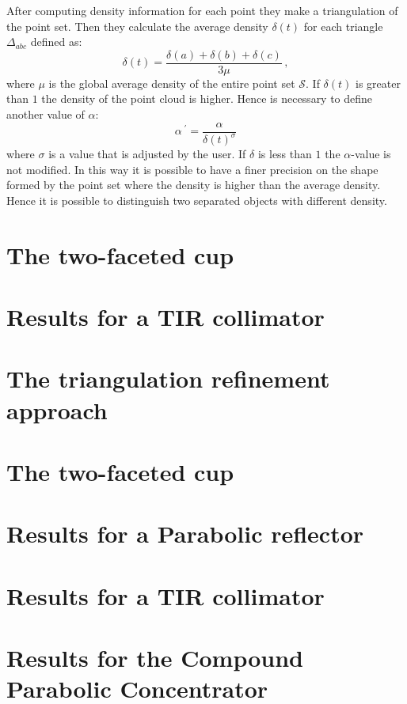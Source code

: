 After computing density information for each point they make a triangulation of the point set. Then they calculate the average density  $\delta(t)$ for each triangle $\Delta_{abc}$ defined as:
\begin{equation}
\delta(t)=\frac{\delta(a)+\delta(b)+\delta(c)}{3 \mu}\,,
\label{delta_t}
\end{equation}
where $\mu$ is the global average density of the entire point set $\mathcal{S}$.
If $\delta(t)$ is greater than $1$ the density of the point cloud is higher. Hence is necessary to define another value of $\alpha$:
\begin{equation}
\alpha^{\;\prime} = \frac{\alpha}{\delta(t)^\sigma}
\end{equation} where $\sigma$ is a value that is adjusted by the user.
If  $\delta$ is less than $1$ the $\alpha$-value is not modified.
In this way it is possible to have a finer precision on the shape formed by the point set where the density is higher than the average density. Hence it is possible to distinguish two separated objects with different density.
\section{The two-faceted cup}
\section{Results for a TIR collimator}
\section{The triangulation refinement approach}
\section{The two-faceted cup}
\section{Results for a Parabolic reflector}
\section{Results for a TIR collimator}
\section{Results for the Compound Parabolic Concentrator}
